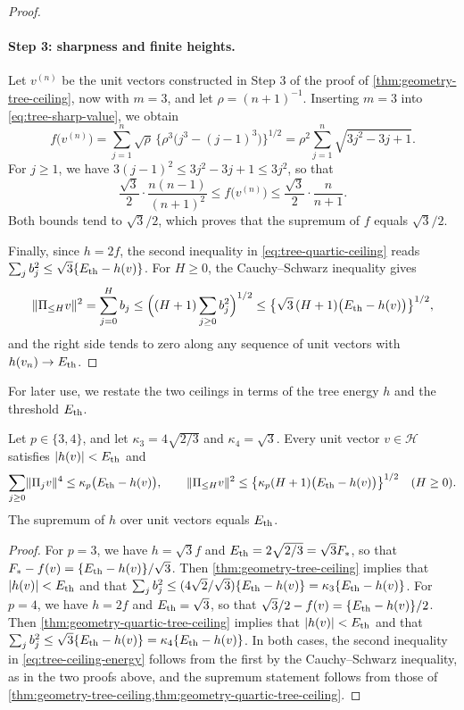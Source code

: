 \begin{proof}
\paragraph{Step 3: sharpness and finite heights.}
Let $v^{(n)}$ be the unit vectors constructed in Step 3 of the proof of \cref{thm:geometry-tree-ceiling}, now with $m=3$, and let $\rho=(n+1)^{-1}$. Inserting $m=3$ into \eqref{eq:tree-sharp-value}, we obtain
\[
 f\bigl(v^{(n)}\bigr)=\sum_{j=1}^n\sqrt\rho\,\bigl\{\rho^3\bigl(j^3-(j-1)^3\bigr)\bigr\}^{1/2}
 =\rho^2\sum_{j=1}^n\sqrt{3j^2-3j+1}.
\]
For $j\ge1$, we have $3(j-1)^2\le3j^2-3j+1\le3j^2$, so that
\[
 \frac{\sqrt3}2\cdot\frac{n(n-1)}{(n+1)^2}\le f\bigl(v^{(n)}\bigr)\le\frac{\sqrt3}2\cdot\frac{n}{n+1}.
\]
Both bounds tend to $\sqrt3/2$, which proves that the supremum of $f$ equals $\sqrt3/2$.

Finally, since $h=2f$, the second inequality in \eqref{eq:tree-quartic-ceiling} reads $\sum_jb_j^2\le\sqrt3\{E_{\mathrm{th}}-h(v)\}$. For $H\ge0$, the Cauchy--Schwarz inequality gives
\[
 \lVert\Pi_{\le H}v\rVert^2=\sum_{j=0}^Hb_j\le\Bigl((H+1)\sum_{j\ge0}b_j^2\Bigr)^{1/2}\le\bigl\{\sqrt3\,(H+1)\bigl(E_{\mathrm{th}}-h(v)\bigr)\bigr\}^{1/2},
\]
and the right side tends to zero along any sequence of unit vectors with $h(v_n)\to E_{\mathrm{th}}$.
\end{proof}

For later use, we restate the two ceilings in terms of the tree energy $h$ and the threshold $E_{\mathrm{th}}$.

\begin{corollary}\label{cor:tree-ceiling-energy}
Let $p\in\{3,4\}$, and let $\kappa_3=4\sqrt{2/3}$ and $\kappa_4=\sqrt3$. Every unit vector $v\in\mathcal H$ satisfies $|h(v)|<E_{\mathrm{th}}$ and
\begin{equation}\label{eq:tree-ceiling-energy}
 \sum_{j\ge0}\lVert\Pi_jv\rVert^4\le\kappa_p\bigl(E_{\mathrm{th}}-h(v)\bigr),\qquad
 \lVert\Pi_{\le H}v\rVert^2\le\bigl\{\kappa_p(H+1)\bigl(E_{\mathrm{th}}-h(v)\bigr)\bigr\}^{1/2}\quad(H\ge0).
\end{equation}
The supremum of $h$ over unit vectors equals $E_{\mathrm{th}}$.
\end{corollary}

\begin{proof}
For $p=3$, we have $h=\sqrt3f$ and $E_{\mathrm{th}}=2\sqrt{2/3}=\sqrt3F_*$, so that $F_*-f(v)=\{E_{\mathrm{th}}-h(v)\}/\sqrt3$. Then \cref{thm:geometry-tree-ceiling} implies that $|h(v)|<E_{\mathrm{th}}$ and that $\sum_jb_j^2\le(4\sqrt2/\sqrt3)\{E_{\mathrm{th}}-h(v)\}=\kappa_3\{E_{\mathrm{th}}-h(v)\}$. For $p=4$, we have $h=2f$ and $E_{\mathrm{th}}=\sqrt3$, so that $\sqrt3/2-f(v)=\{E_{\mathrm{th}}-h(v)\}/2$. Then \cref{thm:geometry-quartic-tree-ceiling} implies that $|h(v)|<E_{\mathrm{th}}$ and that $\sum_jb_j^2\le\sqrt3\{E_{\mathrm{th}}-h(v)\}=\kappa_4\{E_{\mathrm{th}}-h(v)\}$. In both cases, the second inequality in \eqref{eq:tree-ceiling-energy} follows from the first by the Cauchy--Schwarz inequality, as in the two proofs above, and the supremum statement follows from those of \cref{thm:geometry-tree-ceiling,thm:geometry-quartic-tree-ceiling}.
\end{proof}

